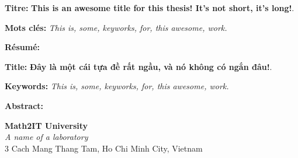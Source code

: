 \documentclass[12pt,a4paper]{article}
\begin{document}
\thispagestyle{empty}	

\begin{tcolorbox}[standard jigsaw, colframe=black!60, opacityback=0]

\smallskip

\textbf{\color{tblue}Titre:} {\color{black!90}\textbf{This is an awesome title for this thesis! It's not short, it's long!}.}

\medskip

\textbf{\color{tblue}Mots clés:} \textit{This is, some, keyworks, for, this awesome, work.}

\medskip

\textbf{\color{tblue}Résumé:}
\lipsum[1-2]


\smallskip

\end{tcolorbox}

\smallskip


\begin{tcolorbox}[standard jigsaw, colframe=black!60, opacityback=0]

\smallskip

\textbf{\color{tblue}Title:} {\color{black!90}\textbf{Đây là một cái tựa đề rất ngầu, và nó không có ngắn đâu!}.}

\medskip

\textbf{\color{tblue}Keywords:} \textit{This is, some, keyworks, for, this awesome, work.}

\medskip

\textbf{\color{tblue}Abstract:}
\lipsum[3-4] 

\smallskip

\end{tcolorbox}

\begin{center}
\textbf{\color{black!90}Math2IT University}\\
\textit{A name of a laboratory}\\
3 Cach Mang Thang Tam, Ho Chi Minh City, Vietnam
\end{center}
\end{document}
